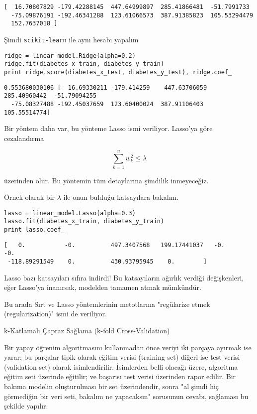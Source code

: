 \documentclass[12pt,fleqn]{article}\usepackage{../../common}
\begin{document}
\begin{verbatim}
[  16.70807829 -179.42288145  447.64999897  285.41866481  -51.7991733
  -75.09876191 -192.46341288  123.61066573  387.91385823  105.53294479
  152.7637018 ]
\end{verbatim}

Şimdi \verb!scikit-learn! ile aynı hesabı yapalım

\begin{verbatim}
ridge = linear_model.Ridge(alpha=0.2)
ridge.fit(diabetes_x_train, diabetes_y_train) 
print ridge.score(diabetes_x_test, diabetes_y_test), ridge.coef_
\end{verbatim}

\begin{verbatim}
0.553680030106 [  16.69330211 -179.414259    447.63706059  285.40960442  -51.79094255
  -75.08327488 -192.45037659  123.60400024  387.91106403  105.55514774]
\end{verbatim}

Bir yöntem daha var, bu yönteme Lasso ismi veriliyor. Lasso'ya göre cezalandırma

$$ \sum_{k=1}^{n} w_k^2 \le \lambda $$

üzerinden olur. Bu yöntemin tüm detaylarına şimdilik
inmeyeceğiz.

Örnek olarak bir $\lambda$ ile onun bulduğu katsayılara bakalım.

\begin{verbatim}
lasso = linear_model.Lasso(alpha=0.3)
lasso.fit(diabetes_x_train, diabetes_y_train)
print lasso.coef_
\end{verbatim}

\begin{verbatim}
[   0.           -0.          497.3407568   199.17441037   -0.           -0.
 -118.89291549    0.          430.93795945    0.        ]
\end{verbatim}

Lasso bazı katsayıları sıfıra indirdi! Bu katsayıların ağırlık verdiği
değişkenleri, eğer Lasso'ya inanırsak, modelden tamamen atmak mümkündür.

Bu arada Sırt ve Lasso yöntemlerinin metotlarına "regülarize etmek
(regularization)" ismi de veriliyor. 

k-Katlamalı Çapraz Sağlama (k-fold Cross-Validation)

Bir yapay öğrenim algoritmasını kullanmadan önce veriyi iki parçaya ayırmak
ise yarar; bu parçalar tipik olarak eğitim verisi (training set) diğeri ise
test verisi (validation set) olarak isimlendirilir. İsimlerden belli
olacağı üzere, algoritma eğitim seti üzerinde eğitilir; ve başarısı test
verisi üzerinden rapor edilir. Bir bakıma modelin oluşturulması bir set
üzerindendir, sonra "al şimdi hiç görmediğin bir veri seti, bakalım ne
yapacaksın" sorusunun cevabı, sağlaması bu şekilde yapılır.
\end{document}
